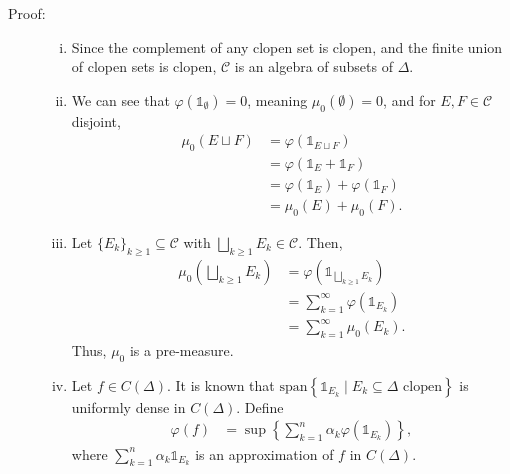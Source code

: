 \documentclass[10pt]{extarticle}
\begin{document}
  \begin{description}
    \item[Proof:]\hfill
      \begin{enumerate}[(i)]
        \item Since the complement of any clopen set is clopen, and the finite union of clopen sets is clopen, $\mathcal{C}$ is an algebra of subsets of $\Delta$.
        \item We can see that $\varphi(\mathbb{1}_{\emptyset}) = 0$, meaning $\mu_0(\emptyset) = 0$, and for $E,F\in \mathcal{C}$ disjoint,
          \begin{align*}
            \mu_0(E\sqcup F) &= \varphi(\mathbb{1}_{E\sqcup F})\\
                             &= \varphi(\mathbb{1}_{E} + \mathbb{1}_{F})\\
                             &= \varphi(\mathbb{1}_{E}) + \varphi(\mathbb{1}_{F})\\
                             &= \mu_0(E) + \mu_0(F).
          \end{align*}
        \item Let $\{E_k\}_{k\geq 1}\subseteq \mathcal{C}$ with $\bigsqcup_{k\geq 1}E_k \in \mathcal{C}$. Then,
          \begin{align*}
            \mu_0\left(\bigsqcup_{k\geq 1}E_k\right) &= \varphi\left(\mathbb{1}_{\bigsqcup_{k\geq 1}E_k}\right)\\
                                                     &= \sum_{k = 1}^{\infty}\varphi(\mathbb{1}_{E_k})\\
                                                     &= \sum_{k=1}^{\infty}\mu_0(E_k).
          \end{align*}
          Thus, $\mu_0$ is a pre-measure.
        \item Let $f\in C(\Delta)$. It is known that $\text{span}\left\{\mathbb{1}_{E_k}\mid E_k\subseteq \Delta\text{ clopen}\right\}$ is uniformly dense in $C(\Delta)$. Define
          \begin{align*}
            \varphi(f) &= \sup\left\{\sum_{k=1}^{n}\alpha_k\varphi\left(\mathbb{1}_{E_k}\right)\right\},
          \end{align*}
          where $\displaystyle\sum_{k=1}^{n}\alpha_k\mathbb{1}_{E_k}$ is an approximation of $f$ in $C(\Delta)$.
      \end{enumerate}
  \end{description}
\end{document}
